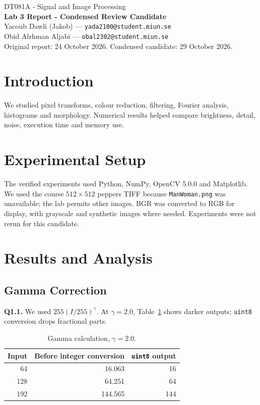 \documentclass[10pt,a4paper]{article}
\begin{document}
\begin{center}
{\large DT081A - Signal and Image Processing}\\[2pt]
{\large\bfseries Lab 3 Report - Condensed Review Candidate}\\[3pt]
Yacoub Dawli (Jakob) --- \texttt{yada2100@student.miun.se}\\
Obid Alrhman Aljabi --- \texttt{obal2302@student.miun.se}\\[2pt]
{\small Original report: 24 October 2026. Condensed candidate: 29 October 2026.}
\end{center}
\vspace{-5pt}

\section{Introduction}
We studied pixel transforms, colour reduction, filtering, Fourier analysis,
histograms and morphology. Numerical results helped compare brightness,
detail, noise, execution time and memory use.

\section{Experimental Setup}
The verified experiments used Python, NumPy, OpenCV 5.0.0 and Matplotlib.
We used the course \(512\times512\) peppers TIFF because \texttt{ManWoman.png}
was unavailable; the lab permits other images. BGR was converted to RGB for
display, with grayscale and synthetic images where needed. Experiments were
not rerun for this candidate.

\section{Results and Analysis}
\subsection{Gamma Correction}
\textbf{Q1.1.} We used \(255(I/255)^\gamma\). At \(\gamma=2.0\),
Table~\ref{tab:gamma} shows darker outputs; \texttt{uint8} conversion drops
fractional parts.

\begin{table}[H]
\centering\small
\caption{Gamma calculation, \(\gamma=2.0\).}\label{tab:gamma}
\begin{tabular}{rrr}\toprule
Input & Before integer conversion & \texttt{uint8} output\\\midrule
64 & 16.063 & 16\\
128 & 64.251 & 64\\
192 & 144.565 & 144\\\bottomrule
\end{tabular}
\end{table}
\end{document}
